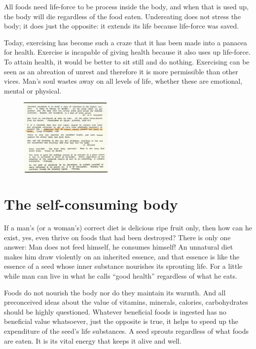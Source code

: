 \documentclass[landscape,twocolumn,letterpaper]{article}
\begin{document}
All foods need life-force to be process inside the body, and when that
is used up, the body will die regardless of the food
eaten. Undereating does not stress the body; it does just the
opposite: it extends its life because life-force was saved.

Today, exercising has become such a craze that it has been made into a
panacea for health. Exercise is incapable of giving health because it
also uses up life-force. To attain health, it would be better to sit
still and do nothing.  Exercising can be seen as an abreation of
unrest and therefore it is more permissible than other vices. Man's
soul wastes away on all levels of life, whether these are emotional,
mental or physical.

\begin{figure} \centering
  \includegraphics[width=0.4\textwidth,bb= 0 0 439 370]{p8.jpg}
\end{figure}


\section{The self-consuming body}

If a man's (or a woman's) correct diet is delicious ripe fruit only,
then how can he exist, yes, even thrive on foods that had been
destroyed? There is only one answer: Man does not feed himself, he
consumes himself! An unnatural diet makes him draw violently on an
inherited essence, and that essence is like the essence of a seed
whose inner substance nourishes its sprouting life. For a little while
man can live in what he calls ``good health'' regardless of what he
eats.

Foods do not nourish the body nor do they maintain its warmth. And all
preconceived ideas about the value of vitamins, minerals, calories,
carbohydrates should be highly questioned. Whatever beneficial foods
is ingested has no beneficial value whatsoever, just the opposite is
true, it helps to speed up the expenditure of the seed's life
substances. A seed sprouts regardless of what foods are eaten. It is
its vital energy that keeps it alive and well.
\end{document}
